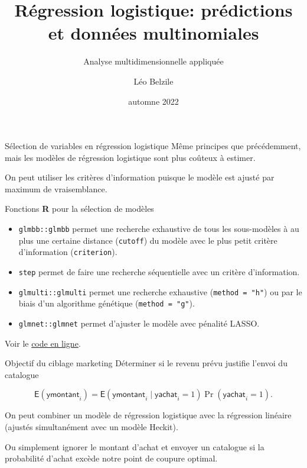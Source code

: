 \documentclass[
  ignorenonframetext,
]{beamer}
\title{Régression logistique: prédictions et données multinomiales}
\subtitle{Analyse multidimensionnelle appliquée}
\author{Léo Belzile}
\date{automne 2022}
\institute{HEC Montréal}
\providecommand{\tightlist}{%
  \setlength{\itemsep}{0pt}\setlength{\parskip}{0pt}}\usepackage{longtable,booktabs,array}
\begin{document}
\frame{\titlepage}
\ifdefined\Shaded\renewenvironment{Shaded}{\begin{tcolorbox}[borderline west={3pt}{0pt}{shadecolor}, enhanced, breakable, interior hidden, boxrule=0pt, frame hidden, sharp corners]}{\end{tcolorbox}}\fi

\begin{frame}{Sélection de variables en régression logistique}
\protect\hypertarget{suxe9lection-de-variables-en-ruxe9gression-logistique}{}
Même principes que précédemment, mais les modèles de régression
logistique sont plus coûteux à estimer.

On peut utiliser les critères d'information puisque le modèle est ajusté
par maximum de vraisemblance.
\end{frame}

\begin{frame}[fragile]{Fonctions \textbf{R} pour la sélection de
modèles}
\protect\hypertarget{fonctions-r-pour-la-suxe9lection-de-moduxe8les}{}
\begin{itemize}
\tightlist
\item
  \texttt{glmbb::glmbb} permet une recherche exhaustive de tous les
  sous-modèles à au plus une certaine distance (\texttt{cutoff}) du
  modèle avec le plus petit critère d'information (\texttt{criterion}).
\item
  \texttt{step} permet de faire une recherche séquentielle avec un
  critère d'information.
\item
  \texttt{glmulti::glmulti} permet une recherche exhaustive
  (\texttt{method\ =\ "h"}) ou par le biais d'un algorithme génétique
  (\texttt{method\ =\ "g"}).
\item
  \texttt{glmnet::glmnet} permet d'ajuster le modèle avec pénalité
  LASSO.
\end{itemize}

Voir le
\href{https://lbelzile.github.io/math60602/05-reglogistique.html\#s\%C3\%A9lection-de-variables-en-r\%C3\%A9gression-logistique}{code
en ligne}.
\end{frame}

\begin{frame}{Objectif du ciblage marketing}
\protect\hypertarget{objectif-du-ciblage-marketing}{}
Déterminer si le revenu prévu justifie l'envoi du catalogue

\[\mathsf{E}(\textsf{ymontant}_i) = \mathsf{E}(\textsf{ymontant}_i \mid \textsf{yachat}_i = 1)\Pr(\textsf{yachat}_i = 1).\]

On peut combiner un modèle de régression logistique avec la régression
linéaire (ajustés simultanément avec un modèle Heckit).

Ou simplement ignorer le montant d'achat et envoyer un catalogue si la
probabilité d'achat excède notre point de coupure optimal.
\end{frame}
\end{document}
